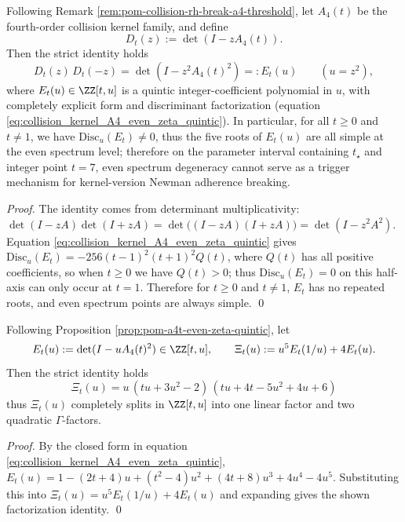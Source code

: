 
\begin{proposition}\label{prop:pom-a4t-even-zeta-quintic}
Following Remark \ref{rem:pom-collision-rh-break-a4-threshold}, let \(A_4(t)\) be the fourth-order collision kernel family, and define
\[
D_t(z):=\det(I-zA_4(t)).
\]
Then the strict identity holds
\[
D_t(z)\,D_t(-z)=\det(I-z^2A_4(t)^2)=:E_t(u)\qquad(u=z^2),
\]
where \(E_t(u)\in\ZZ[t,u]\) is a quintic integer-coefficient polynomial in \(u\), with completely explicit form and discriminant factorization (equation \eqref{eq:collision_kernel_A4_even_zeta_quintic}).
In particular, for all \(t\ge 0\) and \(t\neq 1\), we have \(\mathrm{Disc}_u(E_t)\neq 0\), thus the five roots of \(E_t(u)\) are all simple at the even spectrum level; therefore on the parameter interval containing \(t_\star\) and integer point \(t=7\), even spectrum degeneracy cannot serve as a trigger mechanism for kernel-version Newman adherence breaking.
\end{proposition}
\begin{proof}
The identity comes from determinant multiplicativity:
\(
\det(I-zA)\det(I+zA)=\det\bigl((I-zA)(I+zA)\bigr)=\det(I-z^2A^2)
\).
Equation \eqref{eq:collision_kernel_A4_even_zeta_quintic} gives \(\mathrm{Disc}_u(E_t)=-256(t-1)^2(t+1)^2Q(t)\), where \(Q(t)\) has all positive coefficients, so when \(t\ge 0\) we have \(Q(t)>0\); thus \(\mathrm{Disc}_u(E_t)=0\) on this half-axis can only occur at \(t=1\).
Therefore for \(t\ge 0\) and \(t\neq 1\), \(E_t\) has no repeated roots, and even spectrum points are always simple. \qed
\end{proof}



\begin{proposition}\label{prop:pom-a4t-even-spectrum-completion-gamma-factorization}
Following Proposition \ref{prop:pom-a4t-even-zeta-quintic}, let
\[
E_t(u):=\det(I-uA_4(t)^2)\in\ZZ[t,u],
\qquad
\Xi_t(u):=u^5E_t(1/u)+4E_t(u).
\]
Then the strict identity holds
\[
\boxed{\;
\Xi_t(u)
=
u\,(tu+3u^2-2)\,(tu+4t-5u^2+4u+6)\;}
\]
thus \(\Xi_t(u)\) completely splits in \(\ZZ[t,u]\) into one linear factor and two quadratic \(\Gamma\)-factors.
\end{proposition}
\begin{proof}
By the closed form in equation \eqref{eq:collision_kernel_A4_even_zeta_quintic},
\(E_t(u)=1-(2t+4)u+(t^2-4)u^2+(4t+8)u^3+4u^4-4u^5\).
Substituting this into \(\Xi_t(u)=u^5E_t(1/u)+4E_t(u)\) and expanding gives the shown factorization identity. \qed
\end{proof}

